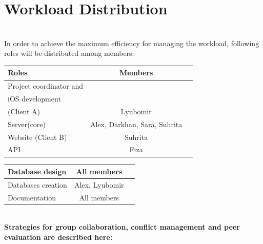 \documentclass[12pt]{article}
\begin{document}
\section{Workload Distribution} \label{sec:firstpage}\\
In order to achieve the maximum efficiency for managing the workload, following roles will be distributed among members:\\
\begin{table}[!ht]
\centering
{} \label{tab:title} 
\smallskip
\begin{tabular}{l c c}
\hline
Roles & Members\\[0.5ex]
\hline
Project coordinator and  \\ iOS development \\ (Client A) & Lyubomir \\[0.5ex]
\hline
Server(core) & Alex, Darkhan, Sara, Suhrita \\[0.5ex]
\hline
Website (Client B) & Suhrita \\[0.5ex]
\hline
API & Fiza \\[0.5ex]
\end{tabular}
\end{table}

\begin{table}[!ht]
\centering
\smallskip
\begin{tabular}{l c c}
\hline
Database design & All members \\[0.5ex]
\hline
Databases creation & Alex, Lyubomir \\[0.5ex]
\hline
Documentation & All members \\[0.5ex]
\hline
\end{tabular}
\end{table}
\\
\textbf{ Strategies for group collaboration, conflict management and peer evaluation are described here:}
\end{document}
